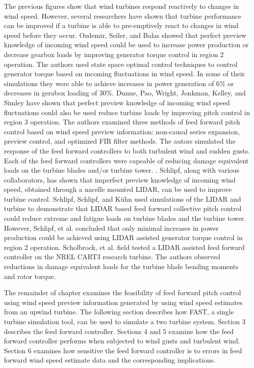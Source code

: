 The previous figures show that wind turbines respond reactively to changes in wind speed. However, several researchers have shown that turbine performance can be improved if a turbine is able to pre-emptively react to changes in wind speed before they occur. Ozdemir, Seiler, and Balas showed that perfect preview knowledge of incoming wind speed could be used to increase power production or decrease gearbox loads by improving generator torque control in region 2 operation. The authors used state space optimal control techniques to control generator torque based on incoming fluctuations in wind speed. In some of their simulations they were able to achieve increases in power generation of 6\% or decreases in gerabox loading of 30\%.\cite{ozdemir2013} Dunne, Pao, Wright, Jonkman, Kelley, and Simley have shown that perfect preview knowledge of incoming wind speed fluctuations could also be used reduce turbine loads by improving pitch control in region 3 operation. The authors examined three methods of feed forward pitch control based on wind speed preview information: non-causal series expansion, preview control, and optimized FIR filter methods. The autors simulated the response of the feed forward controllers to both turbulent wind and sudden gusts. Each of the feed forward controllers were capeable of reducing damage equivalent loads on the turbine blades and/or turbine tower. \cite{dunne2011}. Schlipf, along with various collaborators, has shown that imperfect preview knowledge of incoming wind speed, obtained through a nacelle mounted LIDAR, can be used to improve turbine control.\cite{schlipf2008,schlipf2010,schlipf2011,schlipf2011a,schlipf2013} Schlipf, Schlipf, and K{\"u}hn used simulations of the LIDAR and turbine to demonstrate that LIDAR based feed forward collective pitch control could reduce extreme and fatigue loads on turbine blades and the turbine tower. \cite{schlipf2013} However, Schlipf, et al. concluded that only minimal increases in power production could be achieved using LIDAR assisted generator torque control in region 2 operation.\cite{schlipf2011a}  Scholbrock, et al. field tested a LIDAR assisted feed forward controller on the NREL CART3 research turbine. The authors observed reductions in damage equivalent loads for the turbine blade bending moments and rotor torque. \cite{scholbrock2013}

The remainder of chapter examines the feasibility of feed forward pitch control using wind speed preview information generated by using wind speed estimates from an upwind turbine. The following section describes how FAST, a single turbine simulation tool, can be used to simulate a two turbine system. Section 3 describes the feed forward controller. Sections 4 and 5 examine how the feed forward controller performs when subjected to wind gusts and turbulent wind. Section 6 examines how sensitive the feed forward controller is to errors in feed forward wind speed estimate data and the corresponding implications.




